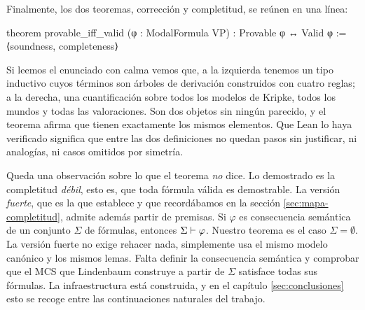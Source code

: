 Finalmente, los dos teoremas, corrección y completitud, se reúnen en una línea:

\begin{leansnippet}
theorem provable_iff_valid (φ : ModalFormula VP) : Provable φ ↔ Valid φ :=
  ⟨soundness, completeness⟩
\end{leansnippet}

Si leemos el enunciado con calma vemos que, a la izquierda tenemos un tipo inductivo cuyos términos son árboles de derivación construidos con cuatro reglas; a la derecha, una cuantificación sobre todos los modelos de Kripke, todos los mundos y todas las valoraciones. Son dos objetos sin ningún parecido, y el teorema afirma que tienen exactamente los mismos elementos. Que Lean lo haya verificado significa que entre las dos definiciones no quedan pasos sin justificar, ni analogías, ni casos omitidos por simetría.

Queda una observación sobre lo que el teorema \emph{no} dice. Lo demostrado es la completitud \emph{débil}, esto es, que toda fórmula válida es demostrable. La versión \emph{fuerte}, que es la que establece \cite[Teorema~4.23]{blackburn} y que recordábamos en la sección \ref{sec:mapa-completitud}, admite además partir de premisas. Si $\varphi$ es consecuencia semántica de un conjunto $\Sigma$ de fórmulas, entonces $\Sigma \vdash \varphi$. Nuestro teorema es el caso $\Sigma = \emptyset$. La versión fuerte no exige rehacer nada, simplemente usa el mismo modelo canónico y los mismos lemas. Falta definir la consecuencia semántica y comprobar que el MCS que Lindenbaum construye a partir de $\Sigma$ satisface todas sus fórmulas. La infraestructura está construida, y en el capítulo \ref{sec:conclusiones} esto se recoge entre las continuaciones naturales del trabajo.